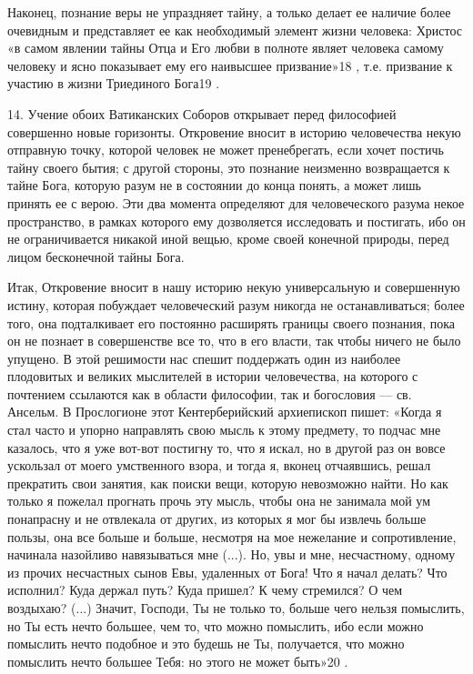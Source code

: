\documentclass[a5paper,10pt]{article}
\begin{document}
Наконец, познание веры не упраздняет тайну, а только делает ее наличие более
очевидным и представляет ее как необходимый элемент жизни человека: Христос «в
самом явлении тайны Отца и Его любви в полноте являет человека самому человеку
и ясно показывает ему его наивысшее призвание»18 , т.е. призвание к участию в
жизни Триединого Бога19 .

14. Учение обоих Ватиканских Соборов открывает перед философией совершенно
новые горизонты. Откровение вносит в историю человечества некую отправную
точку, которой человек не может пренебрегать, если хочет постичь тайну своего
бытия; с другой стороны, это познание неизменно возвращается к тайне Бога,
которую разум не в состоянии до конца понять, а может лишь принять ее с верою.
Эти два момента определяют для человеческого разума некое пространство, в
рамках которого ему дозволяется исследовать и постигать, ибо он не
ограничивается никакой иной вещью, кроме своей конечной природы, перед лицом
бесконечной тайны Бога.

Итак, Откровение вносит в нашу историю некую универсальную и совершенную
истину, которая побуждает человеческий разум никогда не останавливаться; более
того, она подталкивает его постоянно расширять границы своего познания, пока он
не познает в совершенстве все то, что в его власти, так чтобы ничего не было
упущено. В этой решимости нас спешит поддержать один из наиболее плодовитых и
великих мыслителей в истории человечества, на которого с почтением ссылаются
как в области философии, так и богословия — св. Ансельм. В Прослогионе этот
Кентерберийский архиепископ пишет: «Когда я стал часто и упорно направлять свою
мысль к этому предмету, то подчас мне казалось, что я уже вот-вот постигну то,
что я искал, но в другой раз он вовсе ускользал от моего умственного взора, и
тогда я, вконец отчаявшись, решал прекратить свои занятия, как поиски вещи,
которую невозможно найти. Но как только я пожелал прогнать прочь эту мысль,
чтобы она не занимала мой ум понапрасну и не отвлекала от других, из которых я
мог бы извлечь больше пользы, она все больше и больше, несмотря на мое
нежелание и сопротивление, начинала назойливо навязываться мне (...). Но, увы и
мне, несчастному, одному из прочих несчастных сынов Евы, удаленных от Бога! Что
я начал делать? Что исполнил? Куда держал путь? Куда пришел? К чему стремился?
О чем воздыхаю? (...) Значит, Господи, Ты не только то, больше чего нельзя
помыслить, но Ты есть нечто большее, чем то, что можно помыслить, ибо если
можно помыслить нечто подобное и это будешь не Ты, получается, что можно
помыслить нечто большее Тебя: но этого не может быть»20 .
\end{document}
